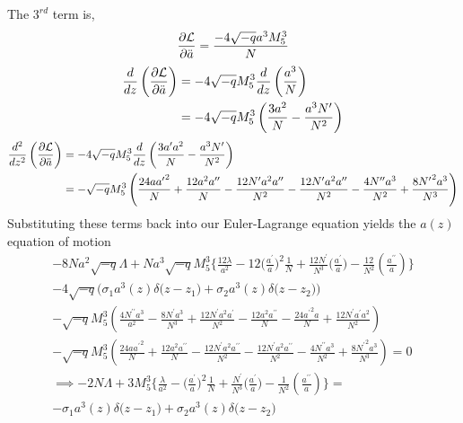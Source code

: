 \documentclass[11pt]{report}
\numberwithin{equation}{chapter}
\begin{document}
The $3^{rd}$ term is,
\begin{equation}
    \frac{\partial\mathcal{L}}{\partial\Ddot{a}}=\frac{-4\sqrt{-q}a^3M^3_5}{N}
\end{equation}
\begin{align}
    \frac{d}{dz}\left(\frac{\partial\mathcal{L}}{\partial\Ddot{a}}\right)&=-4\sqrt{-q}M^3_5\frac{d}{dz}\left(\frac{a^3}{N}\right)\nonumber\\
    &=-4\sqrt{-q}M^3_5\left(\frac{3a^2}{N}-\frac{a^3N^\prime}{N^2}\right)
\end{align}
\begin{align}
    \frac{d^2}{dz^2}\left(\frac{\partial\mathcal{L}}{\partial\Ddot{a}}\right)&=-4\sqrt{-q}M^3_5\frac{d}{dz}\left(\frac{3a^\prime a^2}{N}-\frac{a^3 N^\prime}{N^2}\right)\nonumber\\
    &=-\sqrt{-q}M^3_5\left(\frac{24a{a^\prime}^2}{N}+\frac{12a^2 a^{\prime\prime}}{N}-\frac{12N^\prime a^2 a^{\prime\prime}}{N^2}-\frac{12N^\prime a^2a^{\prime\prime}}{N^2}-\frac{4N^{\prime\prime}a^3 }{N^2}+\frac{8{N^\prime}^2a^3 }{N^3}\right)
 \end{align}
 Substituting these terms back into our Euler-Lagrange equation yields the $a(z)$ equation of motion
\begin{multline}
    -8Na^2\sqrt{-q}\Lambda+Na^3\sqrt{-q}M_5^3\bigg\{\frac{12\lambda}{a^2}-12\bigg(\frac{a^\prime}{a}\bigg)^2\frac{1}{N}+\frac{12N^\prime}{N^3}\bigg(\frac{a^\prime}{a}\bigg)-\frac{12}{N^2}\left(\frac{a^{\prime\prime}}{a}\right)\bigg\}\\
    -4\sqrt{-q}\big(\sigma_1a^3(z)\delta\big(z-z_1\big)+\sigma_2a^3(z)\delta\big(z-z_2\big)\big)\\
    -\sqrt{-q}M^3_5\left(\frac{4N^{\prime\prime}a^3}{a^2}-\frac{8N^\prime a^3}{N^3}+\frac{12N^\prime a^2 a^\prime}{N^2}-\frac{12a^2 a^{\prime\prime}}{N}-\frac{24{a^\prime}^2 a}{N}+\frac{12N^\prime a^\prime a^2}{N^2}\right)\\
    -\sqrt{-q}M^3_5\left(\frac{24a{a^\prime}^2}{N}+\frac{12a^2 a^{\prime\prime}}{N}-\frac{12N^\prime a^2 a^{\prime\prime}}{N^2}-\frac{12N^\prime a^2a^{\prime\prime}}{N^2}-\frac{4N^{\prime\prime}a^3 }{N^2}+\frac{8{N^\prime}^2a^3 }{N^3}\right)=0\\
    \implies -2N\Lambda+3M_5^3\bigg\{\frac{\lambda}{a^2}-\bigg(\frac{a^\prime}{a}\bigg)^2\frac{1}{N}+\frac{N^\prime}{N^3}\bigg(\frac{a^\prime}{a}\bigg)-\frac{1}{N^2}\left(\frac{a^{\prime\prime}}{a}\right)\bigg\}=\\-\sigma_1a^3(z)\delta\big(z-z_1\big)+\sigma_2a^3(z)\delta\big(z-z_2\big)
\end{multline}
\end{document}
